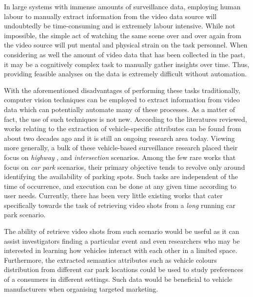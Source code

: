 
In large systems with immense amounts of surveillance data, employing human labour to manually extract information from the video data source will undoubtedly be time-consuming and is extremely labour intensive.
While not impossible, the simple act of watching the same scene over and over again from the video source will put mental and physical strain on the task personnel. When considering as well the amount of video data that has been collected in the past, it may be a cognitively complex task to manually gather insights over time. Thus, providing feasible analyses on the data is extremely difficult without automation.

With the aforementioned disadvantages of performing these tasks traditionally, computer vision techniques can be employed to extract information from video data which can potentially automate many of these processes. As a matter of fact, the use of such techniques is not new. %
According to the literatures reviewed, works relating to the extraction of vehicle-specific attributes can be found
from about two decades ago and it is still an ongoing research area today.
Viewing more generally, a bulk of these vehicle-based surveillance research
placed their focus on \textit{highway} \cite{yu2017improved, cao2016vehicle,
arya2016real, liu2016highway, al2016adaptive}, and  \textit{intersection}
\cite{meng2017traffic, choong2017modeling, ren2018learning} scenarios. Among the
few rare works \cite{shi2017study, marmol2016quickspot, ling2017identifying}
that focus on \emph{car park} scenarios, their primary objective tends to
revolve only around identifying the availability of parking spots. Such tasks
are independent of the time of occurrence, and execution can be done at any
given time according to user needs. Currently, there has been very little existing works
that cater specifically towards the task of retrieving video shots from a
\emph {long} running car park scenario.

The ability of retrieve video shots from such scenario would be useful as it
can assist investigators finding a particular event and even researchers who
may be interested in learning how vehicles interact with each other in a
limited space. Furthermore, the extracted semantics attributes such as vehicle
colours distribution from different car park locations could be used to study
preferences of a consumers in different settings. Such data would be beneficial
to vehicle manufacturers when organising targeted marketing.

